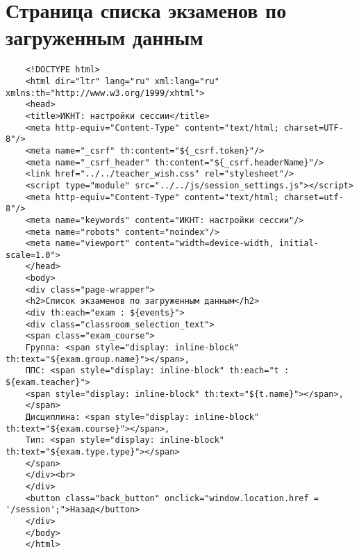 \chapter{Страница списка экзаменов по загруженным данным}\label{appendix-curr}	

\begin{lstlisting}
	<!DOCTYPE html>
	<html dir="ltr" lang="ru" xml:lang="ru" xmlns:th="http://www.w3.org/1999/xhtml">
	<head>
	<title>ИКНТ: настройки сессии</title>
	<meta http-equiv="Content-Type" content="text/html; charset=UTF-8"/>
	<meta name="_csrf" th:content="${_csrf.token}"/>
	<meta name="_csrf_header" th:content="${_csrf.headerName}"/>
	<link href="../../teacher_wish.css" rel="stylesheet"/>
	<script type="module" src="../../js/session_settings.js"></script>
	<meta http-equiv="Content-Type" content="text/html; charset=utf-8"/>
	<meta name="keywords" content="ИКНТ: настройки сессии"/>
	<meta name="robots" content="noindex"/>
	<meta name="viewport" content="width=device-width, initial-scale=1.0">
	</head>
	<body>
	<div class="page-wrapper">
	<h2>Список экзаменов по загруженным данным</h2>
	<div th:each="exam : ${events}">
	<div class="classroom_selection_text">
	<span class="exam_course">
	Группа: <span style="display: inline-block" th:text="${exam.group.name}"></span>,
	ППС: <span style="display: inline-block" th:each="t : ${exam.teacher}">
	<span style="display: inline-block" th:text="${t.name}"></span>,
	</span>
	Дисциплина: <span style="display: inline-block"  th:text="${exam.course}"></span>,
	Тип: <span style="display: inline-block"  th:text="${exam.type.type}"></span>
	</span>
	</div><br>
	</div>
	<button class="back_button" onclick="window.location.href = '/session';">Назад</button>
	</div>
	</body>
	</html>
\end{lstlisting}